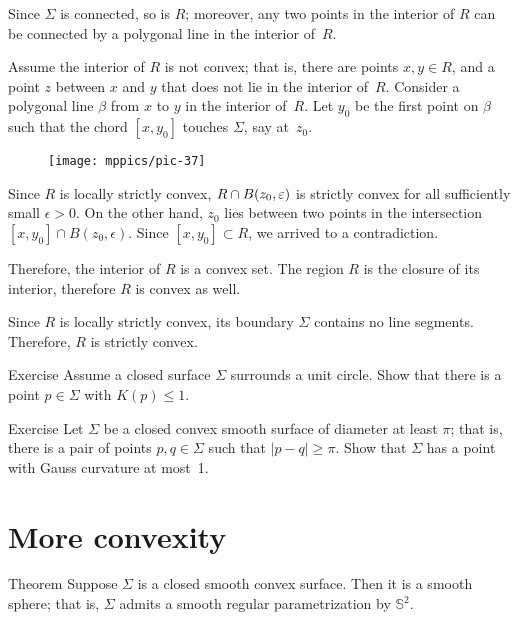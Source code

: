 Since $\Sigma$ is connected, so is $R$;
moreover, any two points in the interior of $R$ can be connected by a polygonal line in the interior of~$R$.

Assume the interior of $R$ is not convex;
that is, there are points $x,y\in R$, and a point $z$ between $x$ and $y$ that does not lie in the interior of~$R$.
Consider a polygonal  line $\beta$ from $x$ to $y$ in the interior of~$R$.
Let $y_0$ be the first point on $\beta$ such that the chord $[x,y_0]$ touches $\Sigma$, say at~$z_0$.

\begin{wrapfigure}{o}{43 mm}
\vskip-0mm
\centering
\texttt{[image: mppics/pic-37]}
\vskip-0mm
\end{wrapfigure}

Since $R$ is locally strictly convex, $R\z\cap B(z_0,\epsilon)$ is strictly convex for all sufficiently small $\epsilon>0$.
On the other hand, $z_0$ lies between two points in the intersection $[x,y_0]\cap B(z_0,\epsilon)$.
Since $[x,y_0]\subset R$, we arrived to a contradiction.

Therefore, the interior of $R$ is a convex set.
The region $R$ is the closure of its interior, therefore $R$ is convex as well.

Since $R$ is locally strictly convex, its boundary $\Sigma$ contains no line segments.
Therefore, $R$ is strictly convex.
\qeds

\begin{thm}{Exercise}\label{ex:surrounds-disc}
Assume a closed surface $\Sigma$ surrounds a unit circle.
Show that there is a point  $p \in \Sigma$ with $K(p)\le 1$.
\end{thm} 

\begin{thm}{Exercise}\label{ex:small-gauss}
Let $\Sigma$ be a closed convex smooth surface of diameter at least $\pi$;
that is, there is a pair of points $p,q\in\Sigma$ such that $|p-q|\ge \pi$.
Show that $\Sigma$ has a point with Gauss curvature at most~1.
\end{thm}

\section{More convexity}

\begin{thm}{Theorem}\label{thm:convex-closed}
Suppose $\Sigma$ is a closed smooth convex surface.
Then it is a smooth sphere; that is, $\Sigma$ admits a smooth regular parametrization by $\mathbb{S}^2$.\end{thm}

